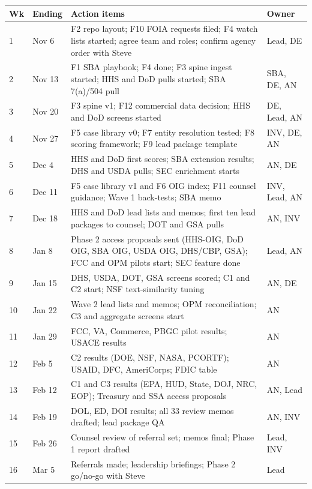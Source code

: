 \documentclass[letterpaper,11pt]{article}
\begin{document}
\begingroup\small\setlength{\tabcolsep}{4pt}\renewcommand{\arraystretch}{1.25}
\begin{longtable}[l]{@{}ll>{\raggedright\arraybackslash}p{}>{\raggedright\arraybackslash}p{}@{}}
\rowcolor{coolblack}\leavevmode\color{white}\bfseries Wk & \leavevmode\color{white}\bfseries Ending & \leavevmode\color{white}\bfseries Action items & \leavevmode\color{white}\bfseries Owner \\
\endhead
1 & Nov 6 & F2 repo layout; F10 FOIA requests filed; F4 watch lists started; agree team and roles; confirm agency order with Steve & Lead, DE \\
2 & Nov 13 & F1 SBA playbook; F4 done; F3 spine ingest started; HHS and DoD pulls started; SBA 7(a)/504 pull & SBA, DE, AN \\
3 & Nov 20 & F3 spine v1; F12 commercial data decision; HHS and DoD screens started & DE, Lead, AN \\
4 & Nov 27 & F5 case library v0; F7 entity resolution tested; F8 scoring framework; F9 lead package template & INV, DE, AN \\
5 & Dec 4 & HHS and DoD first scores; SBA extension results; DHS and USDA pulls; SEC enrichment starts & AN, DE \\
6 & Dec 11 & F5 case library v1 and F6 OIG index; F11 counsel guidance; Wave 1 back-tests; SBA memo & INV, Lead, AN \\
7 & Dec 18 & HHS and DoD lead lists and memos; first ten lead packages to counsel; DOT and GSA pulls & AN, INV \\
8 & Jan 8 & Phase 2 access proposals sent (HHS-OIG, DoD OIG, SBA OIG, USDA OIG, DHS/CBP, GSA); FCC and OPM pilots start; SEC feature done & Lead, AN \\
9 & Jan 15 & DHS, USDA, DOT, GSA screens scored; C1 and C2 start; NSF text-similarity tuning & AN, DE \\
10 & Jan 22 & Wave 2 lead lists and memos; OPM reconciliation; C3 and aggregate screens start & AN \\
11 & Jan 29 & FCC, VA, Commerce, PBGC pilot results; USACE results & AN \\
12 & Feb 5 & C2 results (DOE, NSF, NASA, PCORTF); USAID, DFC, AmeriCorps; FDIC table & AN \\
13 & Feb 12 & C1 and C3 results (EPA, HUD, State, DOJ, NRC, EOP); Treasury and SSA access proposals & AN, Lead \\
14 & Feb 19 & DOL, ED, DOI results; all 33 review memos drafted; lead package QA & AN, INV \\
15 & Feb 26 & Counsel review of referral set; memos final; Phase 1 report drafted & Lead, INV \\
16 & Mar 5 & Referrals made; leadership briefings; Phase 2 go/no-go with Steve & Lead \\
\end{longtable}\endgroup
\end{document}
